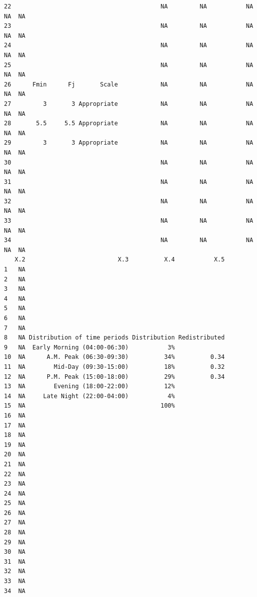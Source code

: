 \documentclass[
11pt, %
oneside, %
english, %
singlespacing, %
]{macthesis} %
\begin{document}
\begin{verbatim}
22                                          NA         NA           NA NA  NA
23                                          NA         NA           NA NA  NA
24                                          NA         NA           NA NA  NA
25                                          NA         NA           NA NA  NA
26      Fmin      Fj       Scale            NA         NA           NA NA  NA
27         3       3 Appropriate            NA         NA           NA NA  NA
28       5.5     5.5 Appropriate            NA         NA           NA NA  NA
29         3       3 Appropriate            NA         NA           NA NA  NA
30                                          NA         NA           NA NA  NA
31                                          NA         NA           NA NA  NA
32                                          NA         NA           NA NA  NA
33                                          NA         NA           NA NA  NA
34                                          NA         NA           NA NA  NA
   X.2                          X.3          X.4           X.5
1   NA                                                        
2   NA                                                        
3   NA                                                        
4   NA                                                        
5   NA                                                        
6   NA                                                        
7   NA                                                        
8   NA Distribution of time periods Distribution Redistributed
9   NA  Early Morning (04:00-06:30)           3%              
10  NA      A.M. Peak (06:30-09:30)          34%          0.34
11  NA        Mid-Day (09:30-15:00)          18%          0.32
12  NA      P.M. Peak (15:00-18:00)          29%          0.34
13  NA        Evening (18:00-22:00)          12%              
14  NA     Late Night (22:00-04:00)           4%              
15  NA                                      100%              
16  NA                                                        
17  NA                                                        
18  NA                                                        
19  NA                                                        
20  NA                                                        
21  NA                                                        
22  NA                                                        
23  NA                                                        
24  NA                                                        
25  NA                                                        
26  NA                                                        
27  NA                                                        
28  NA                                                        
29  NA                                                        
30  NA                                                        
31  NA                                                        
32  NA                                                        
33  NA                                                        
34  NA                                                        
\end{verbatim}
\end{document}
